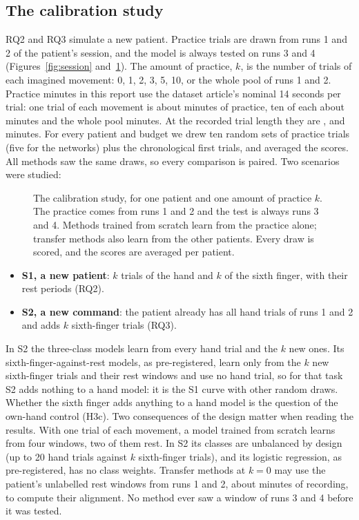 \subsection{The calibration study}
RQ2 and RQ3 simulate a new patient. Practice trials are drawn from runs 1 and 2 of the
patient's session, and the model is always tested on runs 3 and 4
(Figures~\ref{fig:session} and~\ref{fig:calibdesign}).
The amount of practice, $k$, is the number of trials of each imagined movement: 0, 1, 2,
3, 5, 10, or the whole pool of runs 1 and 2. Practice minutes in this report use the
dataset article's nominal 14 seconds per trial: one trial of each movement is about
\rqTwoMinutesKOne{} minutes of practice, ten of each about \rqTwoMinutesKTen{} minutes and
the whole pool \rqTwoMinutesKAll{} minutes. At the recorded trial length they are
\rqTwoMinutesRecordedKOne{}, \rqTwoMinutesRecordedKTen{} and \rqTwoMinutesRecordedKAll{}
minutes. For every patient and budget we drew ten random sets of
practice trials (five for the networks) plus the chronological first trials, and averaged
the scores. All methods saw the same draws, so every comparison is paired. Two scenarios
were studied:
\begin{figure}[!tbp]
  \centering
  
  \caption[The calibration study]{The calibration study, for one patient and one amount of
  practice $k$. The practice comes from runs 1 and 2 and the test is always runs 3 and 4.
  Methods trained from scratch learn from the practice alone; transfer methods also learn
  from the other patients. Every draw is scored, and the scores are averaged per patient.}
  \label{fig:calibdesign}
\end{figure}

\begin{itemize}
  \item \textbf{S1, a new patient}: $k$ trials of the hand and $k$ of the sixth finger,
  with their rest periods (RQ2).
  \item \textbf{S2, a new command}: the patient already has all hand trials of runs 1 and
  2 and adds $k$ sixth-finger trials (RQ3).
\end{itemize}
In S2 the three-class models learn from every hand trial and the $k$ new ones. Its
sixth-finger-against-rest models, as pre-registered, learn only from the $k$ new
sixth-finger trials and their rest windows and use no hand trial, so for that task S2 adds
nothing to a hand model: it is the S1 curve with other random draws. Whether the sixth
finger adds anything to a hand model is the question of the own-hand control (H3c). Two
consequences of the design matter when reading the results. With one trial of each
movement, a model trained from scratch learns from four windows, two of them rest. In S2
its classes are unbalanced by design (up to 20 hand trials against $k$ sixth-finger
trials), and its logistic regression, as pre-registered, has no class weights.
Transfer methods at $k = 0$ may use the patient's unlabelled rest windows from runs 1 and
2, about \rqTwoRestMinutes{} minutes of recording, to compute their alignment. No method
ever saw a window of runs 3 and 4 before it was tested.


